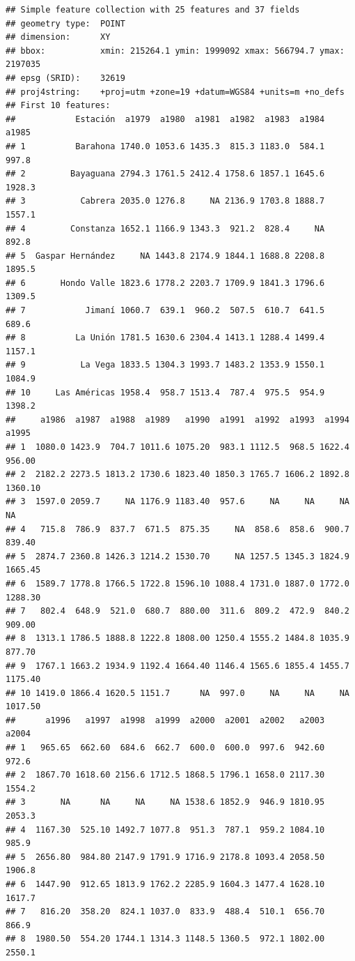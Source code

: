 \documentclass[11pt,]{article}
\begin{document}
\begin{verbatim}
## Simple feature collection with 25 features and 37 fields
## geometry type:  POINT
## dimension:      XY
## bbox:           xmin: 215264.1 ymin: 1999092 xmax: 566794.7 ymax: 2197035
## epsg (SRID):    32619
## proj4string:    +proj=utm +zone=19 +datum=WGS84 +units=m +no_defs
## First 10 features:
##            Estación  a1979  a1980  a1981  a1982  a1983  a1984  a1985
## 1          Barahona 1740.0 1053.6 1435.3  815.3 1183.0  584.1  997.8
## 2         Bayaguana 2794.3 1761.5 2412.4 1758.6 1857.1 1645.6 1928.3
## 3           Cabrera 2035.0 1276.8     NA 2136.9 1703.8 1888.7 1557.1
## 4         Constanza 1652.1 1166.9 1343.3  921.2  828.4     NA  892.8
## 5  Gaspar Hernández     NA 1443.8 2174.9 1844.1 1688.8 2208.8 1895.5
## 6       Hondo Valle 1823.6 1778.2 2203.7 1709.9 1841.3 1796.6 1309.5
## 7            Jimaní 1060.7  639.1  960.2  507.5  610.7  641.5  689.6
## 8          La Unión 1781.5 1630.6 2304.4 1413.1 1288.4 1499.4 1157.1
## 9           La Vega 1833.5 1304.3 1993.7 1483.2 1353.9 1550.1 1084.9
## 10     Las Américas 1958.4  958.7 1513.4  787.4  975.5  954.9 1398.2
##     a1986  a1987  a1988  a1989   a1990  a1991  a1992  a1993  a1994   a1995
## 1  1080.0 1423.9  704.7 1011.6 1075.20  983.1 1112.5  968.5 1622.4  956.00
## 2  2182.2 2273.5 1813.2 1730.6 1823.40 1850.3 1765.7 1606.2 1892.8 1360.10
## 3  1597.0 2059.7     NA 1176.9 1183.40  957.6     NA     NA     NA      NA
## 4   715.8  786.9  837.7  671.5  875.35     NA  858.6  858.6  900.7  839.40
## 5  2874.7 2360.8 1426.3 1214.2 1530.70     NA 1257.5 1345.3 1824.9 1665.45
## 6  1589.7 1778.8 1766.5 1722.8 1596.10 1088.4 1731.0 1887.0 1772.0 1288.30
## 7   802.4  648.9  521.0  680.7  880.00  311.6  809.2  472.9  840.2  909.00
## 8  1313.1 1786.5 1888.8 1222.8 1808.00 1250.4 1555.2 1484.8 1035.9  877.70
## 9  1767.1 1663.2 1934.9 1192.4 1664.40 1146.4 1565.6 1855.4 1455.7 1175.40
## 10 1419.0 1866.4 1620.5 1151.7      NA  997.0     NA     NA     NA 1017.50
##      a1996   a1997  a1998  a1999  a2000  a2001  a2002   a2003  a2004
## 1   965.65  662.60  684.6  662.7  600.0  600.0  997.6  942.60  972.6
## 2  1867.70 1618.60 2156.6 1712.5 1868.5 1796.1 1658.0 2117.30 1554.2
## 3       NA      NA     NA     NA 1538.6 1852.9  946.9 1810.95 2053.3
## 4  1167.30  525.10 1492.7 1077.8  951.3  787.1  959.2 1084.10  985.9
## 5  2656.80  984.80 2147.9 1791.9 1716.9 2178.8 1093.4 2058.50 1906.8
## 6  1447.90  912.65 1813.9 1762.2 2285.9 1604.3 1477.4 1628.10 1617.7
## 7   816.20  358.20  824.1 1037.0  833.9  488.4  510.1  656.70  866.9
## 8  1980.50  554.20 1744.1 1314.3 1148.5 1360.5  972.1 1802.00 2550.1

\end{verbatim}
\end{document}
